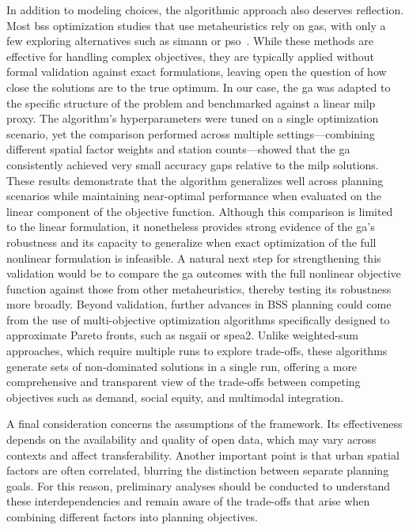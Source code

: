 In addition to modeling choices, the algorithmic approach also deserves reflection. Most \ac{bss} optimization studies that use metaheuristics rely on \acp{ga}, with only a few exploring alternatives such as \ac{simann} or \ac{pso}~\cite{Cintrano2018, Qian2022, Liu2015, Caggiani2020}. While these methods are effective for handling complex objectives, they are typically applied without formal validation against exact formulations, leaving open the question of how close the solutions are to the true optimum. In our case, the \ac{ga} was adapted to the specific structure of the problem and benchmarked against a linear \ac{milp} proxy. The algorithm's hyperparameters were tuned on a single optimization scenario, yet the comparison performed across multiple settings—combining different spatial factor weights and station counts—showed that the \ac{ga} consistently achieved very small accuracy gaps relative to the \ac{milp} solutions. These results demonstrate that the algorithm generalizes well across planning scenarios while maintaining near-optimal performance when evaluated on the linear component of the objective function. Although this comparison is limited to the linear formulation, it nonetheless provides strong evidence of the \ac{ga}'s robustness and its capacity to generalize when exact optimization of the full nonlinear formulation is infeasible. A natural next step for strengthening this validation would be to compare the \ac{ga} outcomes with the full nonlinear objective function against those from other metaheuristics, thereby testing its robustness more broadly. Beyond validation, further advances in BSS planning could come from the use of multi-objective optimization algorithms specifically designed to approximate Pareto fronts, such as \ac{nsgaii} or \ac{spea2}. Unlike weighted-sum approaches, which require multiple runs to explore trade-offs, these algorithms generate sets of non-dominated solutions in a single run, offering a more comprehensive and transparent view of the trade-offs between competing objectives such as demand, social equity, and multimodal integration.

A final consideration concerns the assumptions of the framework. Its effectiveness depends on the availability and quality of open data, which may vary across contexts and affect transferability. Another important point is that urban spatial factors are often correlated, blurring the distinction between separate planning goals. For this reason, preliminary analyses should be conducted to understand these interdependencies and remain aware of the trade-offs that arise when combining different factors into planning objectives.

